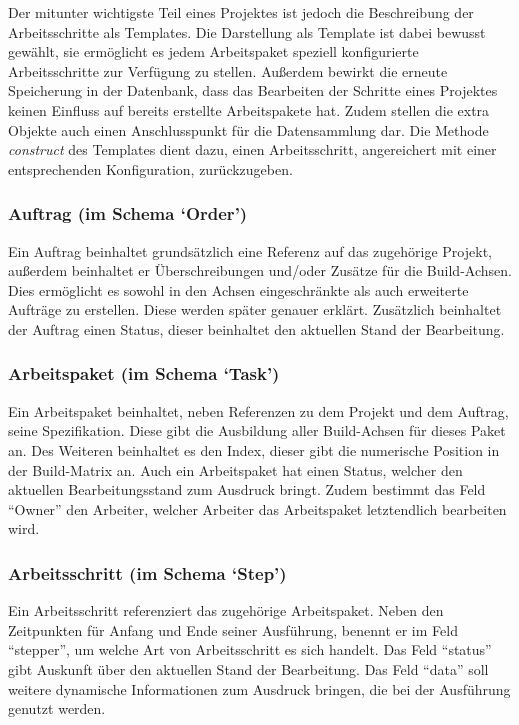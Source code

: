 Der mitunter wichtigste Teil eines Projektes ist jedoch die Beschreibung der Arbeitsschritte als Templates.
Die Darstellung als Template ist dabei bewusst gewählt,
sie ermöglicht es jedem Arbeitspaket speziell konfigurierte Arbeitsschritte zur Verfügung zu stellen.
Außerdem bewirkt die erneute Speicherung in der Datenbank,
dass das Bearbeiten der Schritte eines Projektes keinen Einfluss auf bereits erstellte Arbeitspakete hat.
Zudem stellen die extra Objekte auch einen Anschlusspunkt für die Datensammlung dar.
Die Methode \textit{construct} des Templates dient dazu,
einen Arbeitsschritt, angereichert mit einer entsprechenden Konfiguration, zurückzugeben.

\subsubsection{Auftrag (im Schema `Order')}

Ein Auftrag beinhaltet grundsätzlich eine Referenz auf das zugehörige Projekt,
außerdem beinhaltet er Überschreibungen und/oder Zusätze für die Build-Achsen.
Dies ermöglicht es sowohl in den Achsen eingeschränkte
als auch erweiterte Aufträge zu erstellen.
Diese werden später genauer erklärt.
Zusätzlich beinhaltet der Auftrag einen Status, dieser beinhaltet den aktuellen Stand der Bearbeitung.

\subsubsection{Arbeitspaket (im Schema `Task')}
Ein Arbeitspaket beinhaltet, neben Referenzen zu dem Projekt und dem Auftrag,
seine Spezifikation. Diese gibt die Ausbildung aller Build-Achsen für dieses Paket an.
Des Weiteren beinhaltet es den Index, dieser gibt die numerische Position in der Build-Matrix an.
Auch ein Arbeitspaket hat einen Status, welcher den aktuellen Bearbeitungsstand zum Ausdruck bringt.
Zudem bestimmt das Feld ``Owner'' den Arbeiter, welcher Arbeiter das Arbeitspaket letztendlich bearbeiten wird.

\subsubsection{Arbeitsschritt (im Schema `Step')}

Ein Arbeitsschritt referenziert das zugehörige Arbeitspaket.
Neben den Zeitpunkten für Anfang und Ende seiner Ausführung,
benennt er im Feld ``stepper'', um welche Art von Arbeitsschritt es sich handelt.
Das Feld ``status'' gibt Auskunft über den aktuellen Stand der Bearbeitung.
Das Feld ``data'' soll weitere dynamische Informationen zum Ausdruck bringen,
die bei der Ausführung genutzt werden.

